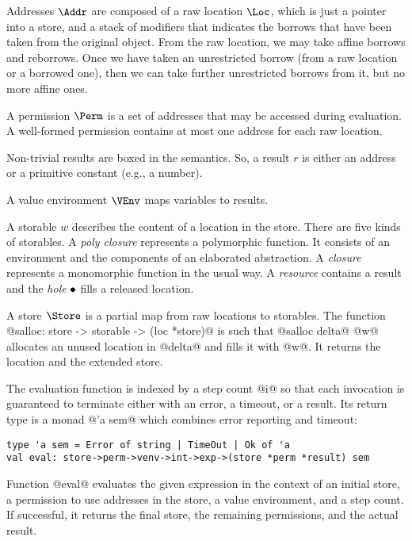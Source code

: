 Addresses $\Addr$ are composed of a raw location $\Loc$, which is just
a pointer into a store, and a stack of modifiers that indicates the
borrows that have been taken from the original object. From the raw
location, we may take affine borrows and reborrows. Once we have
taken an unrestricted borrow (from a raw location or a borrowed one),
then we can take further unrestricted borrows from it, but no more
affine ones.

A permission $\Perm$ is a set of addresses that may be accessed during
evaluation. A well-formed permission contains at most one address for each raw
location.

Non-trivial results are boxed in the  semantics. So, a result
$r$ is either an address or a primitive constant (e.g., a number).

A value environment $\VEnv$  maps variables to results.

A storable $w$ describes the content of a location in the store. There are five
kinds of storables. A \emph{poly closure} represents a polymorphic
function. It consists of an environment and the components of an
elaborated abstraction. A \emph{closure} represents a monomorphic
function in the usual way.
A \emph{resource} contains
a result and the \emph{hole} $\bullet$ fills a released location.

A store $\Store$ is a partial map from raw locations to
storables. The function
@salloc: store -> storable -> (loc *store)@ is such that
@salloc delta@ @w@ allocates an unused location in @delta@ and fills it with
@w@. It returns the location and the extended store.


The evaluation function is indexed by a step count @i@ so that each
invocation is guaranteed to terminate either with an error, a timeout,
or a result. Its return type is a monad
@'a sem@ which combines error reporting and timeout:
\begin{lstlisting}
type 'a sem = Error of string | TimeOut | Ok of 'a
val eval: store->perm->venv->int->exp->(store *perm *result) sem
\end{lstlisting}
Function @eval@ evaluates the given expression in the context of an initial store, a
permission to use addresses in the store, a value environment, and a
step count. If successful, it returns the final store, the remaining
permissions, and the actual result.



